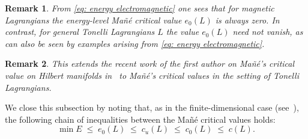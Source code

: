 \documentclass[11pt,reqno]{amsart}
\theoremstyle{plain}
\newtheorem{rem}[thm]{Remark}
\theoremstyle{definition}
\theoremstyle{plain} %
\newtheorem{rem}[rem]{Remark}
\theoremstyle{definition} %
\numberwithin{equation}{section}
\begin{document}
\begin{rem}
    From \eqref{eq: energy electromagnetic} one sees that for magnetic Lagrangians the energy-level Mañé critical value $e_0(L)$ is always zero. 
    In contrast, for general Tonelli Lagrangians $L$ the value $e_0(L)$ need not vanish, as can also be seen by examples arising from \eqref{eq: energy electromagnetic}.
\end{rem}
\begin{rem}
   This extends the recent work of the first author on Mañé’s critical value on Hilbert manifolds in~\cite{M24} to Mañé’s critical values in the setting of Tonelli Lagrangians.
\end{rem}
We close this subsection by noting that, as in the finite-dimensional case (see~\cite{Abbo13Lect}), 
the following chain of inequalities between the Mañé critical values holds:
\[
    \min E \;\leq\; e_0(L) \;\leq\; c_u(L) \;\leq\; c_0(L) \;\leq\; c(L).
\]

\end{document}
